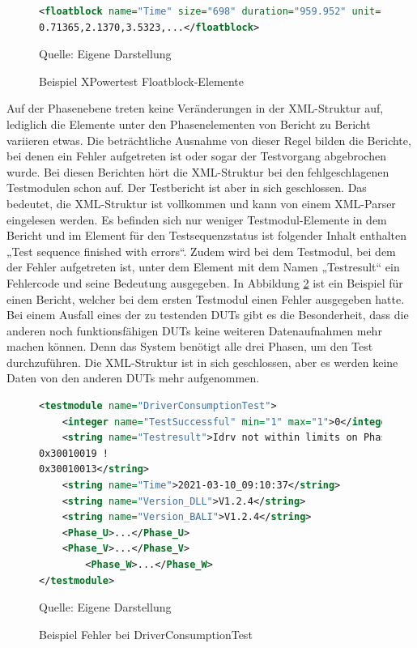 \begin{figure}[H]
\centering
\begin{minipage}{0.95\textwidth}
\begin{lstlisting}[language=XML]
<floatblock name="Time" size="698" duration="959.952" unit="s">
0.71365,2.1370,3.5323,...</floatblock>
\end{lstlisting}
\end{minipage}
\caption{Beispiel XPowertest Floatblock-Elemente}
\label{fig: Beispiel XPowertest Floatblock-Elemente}
    {Quelle: Eigene Darstellung}
\end{figure}

Auf der Phasenebene treten keine Veränderungen in der \ac{XML}-Struktur auf, lediglich die Elemente unter den
Phasenelementen von Bericht zu Bericht variieren etwas.
Die beträchtliche Ausnahme von dieser Regel bilden die Berichte, bei denen ein Fehler aufgetreten ist oder sogar der
Testvorgang abgebrochen wurde. Bei diesen Berichten hört die \ac{XML}-Struktur bei den fehlgeschlagenen Testmodulen schon auf.
Der Testbericht ist aber in sich geschlossen. Das bedeutet, die \ac{XML}-Struktur ist vollkommen und kann von einem \ac{XML}-Parser eingelesen werden.
Es befinden sich nur weniger Testmodul-Elemente in dem Bericht und im Element für den Testsequenzstatus ist folgender Inhalt
enthalten „Test sequence finished with errors“. Zudem wird bei dem Testmodul, bei dem der Fehler aufgetreten ist, unter
dem Element mit dem Namen „Testresult“ ein Fehlercode und seine Bedeutung ausgegeben. In Abbildung \ref{fig: Beispiel Fehler bei DriverConsumptionTest} ist ein
Beispiel für einen Bericht, welcher bei dem ersten Testmodul einen Fehler ausgegeben hatte.
Bei einem Ausfall eines der zu testenden \ac{DUTs} gibt es die Besonderheit, dass die anderen noch funktionsfähigen \ac{DUTs}
keine weiteren Datenaufnahmen mehr machen können. Denn das System benötigt alle drei Phasen, um den Test durchzuführen.
Die \ac{XML}-Struktur ist in sich geschlossen, aber es werden keine Daten von den anderen \ac{DUTs} mehr aufgenommen.

\begin{figure}[H]
\centering
\begin{minipage}{0.95\textwidth}
\begin{lstlisting}[language=XML]
<testmodule name="DriverConsumptionTest">
    <integer name="TestSuccessful" min="1" max="1">0</integer>
    <string name="Testresult">Idrv not within limits on Phase U
0x30010019 !
0x30010013</string>
    <string name="Time">2021-03-10_09:10:37</string>
    <string name="Version_DLL">V1.2.4</string>
    <string name="Version_BALI">V1.2.4</string>
    <Phase_U>...</Phase_U>
    <Phase_V>...</Phase_V>
        <Phase_W>...</Phase_W>
</testmodule>
\end{lstlisting}
\end{minipage}
\caption{Beispiel Fehler bei DriverConsumptionTest}
\label{fig: Beispiel Fehler bei DriverConsumptionTest}
    {Quelle: Eigene Darstellung}
\end{figure}

